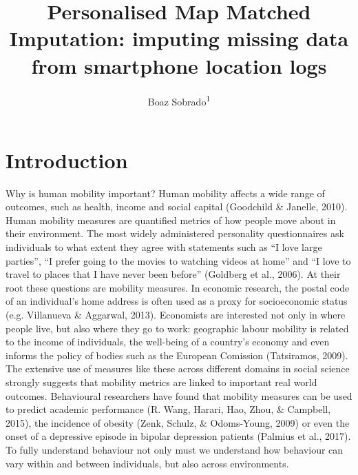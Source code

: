 \documentclass[man]{apa6}
\title{Personalised Map Matched Imputation: imputing missing data from
smartphone location logs}
\author{Boaz Sobrado\textsuperscript{1}}
\affiliation{
    \vspace{0.5cm}
          \textsuperscript{1} Utrecht University  }
\theoremstyle{definition}
\theoremstyle{definition}
\theoremstyle{definition}
\theoremstyle{remark}
\begin{document}
\maketitle

\setcounter{secnumdepth}{0}



\section{Introduction}\label{introduction}

Why is human mobility important? Human mobility affects a wide range of
outcomes, such as health, income and social capital (Goodchild \&
Janelle, 2010). Human mobility measures are quantified metrics of how
people move about in their environment. The most widely administered
personality questionnaires ask individuals to what extent they agree
with statements such as \enquote{I love large parties}, \enquote{I
prefer going to the movies to watching videos at home} and \enquote{I
love to travel to places that I have never been before} (Goldberg et
al., 2006). At their root these questions are mobility measures. In
economic research, the postal code of an individual's home address is
often used as a proxy for socioeconomic status (e.g. Villanueva \&
Aggarwal, 2013). Economists are interested not only in where people
live, but also where they go to work: geographic labour mobility is
related to the income of individuals, the well-being of a country's
economy and even informs the policy of bodies such as the European
Comission (Tatsiramos, 2009). The extensive use of measures like these
across different domains in social science strongly suggests that
mobility metrics are linked to important real world outcomes.
Behavioural researchers have found that mobility measures can be used to
predict academic performance (R. Wang, Harari, Hao, Zhou, \& Campbell,
2015), the incidence of obesity (Zenk, Schulz, \& Odoms-Young, 2009) or
even the onset of a depressive episode in bipolar depression patients
(Palmius et al., 2017). To fully understand behaviour not only must we
understand how behaviour can vary within and between individuals, but
also across environments.
\end{document}

